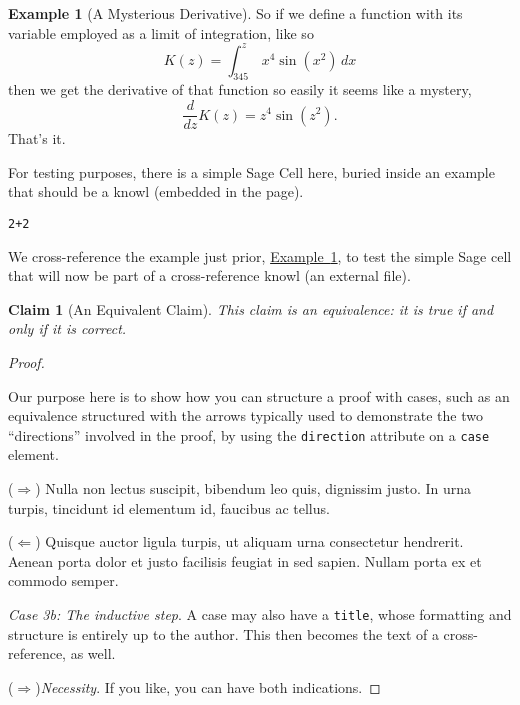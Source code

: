 \documentclass[10pt,]{article}
\newcommand{\forwardimplication}{($\Rightarrow$)\space\space}
\newcommand{\backwardimplication}{($\Leftarrow$)\space\space}
\theoremstyle{plain}
\newtheorem{claim}[theorem]{Claim}
\theoremstyle{definition}
\theoremstyle{definition}
\theoremstyle{definition}
\theoremstyle{definition}
\newtheorem{example}[theorem]{Example}
\theoremstyle{definition}
\theoremstyle{definition}
\numberwithin{equation}{section}
\newcommand{\definiteintegral}[4]{\int_{#1}^{#2}\,#3\,d#4}
\begin{document}
\begin{example}[A Mysterious Derivative]\label{example-mysterious}
\hypertarget{p-38}{}%
So if we define a function with its variable employed as a limit of integration, like so%
\begin{equation*}
K(z)=\definiteintegral{345}{z}{x^4\sin(x^2)}{x}
\end{equation*}
then we get the derivative of that function so easily it seems like a mystery,%
\begin{equation*}
\frac{d}{dz}K(z)=z^4\sin(z^2)\text{.}
\end{equation*}
That's it.%
\par
\hypertarget{p-39}{}%
For testing purposes, there is a simple Sage Cell here, buried inside an example that should be a knowl (embedded in the page).%
\begin{lstlisting}[style=sageinput]
2+2
\end{lstlisting}
\end{example}
\hypertarget{p-40}{}%
We cross-reference the example just prior, \hyperref[example-mysterious]{Example~\ref{example-mysterious}}, to test the simple Sage cell that will now be part of a cross-reference knowl (an external file).%
\begin{claim}[{An Equivalent Claim}]\label{claim-with-cases}
\hypertarget{p-41}{}%
This claim is an equivalence: it is true if and only if it is correct.%
\end{claim}
\begin{proof}\hypertarget{proof-4}{}
\hypertarget{p-42}{}%
Our purpose here is to show how you can structure a proof with cases, such as an equivalence structured with the arrows typically used to demonstrate the two ``directions'' involved in the proof, by using the \lstinline?direction? attribute on a \lstinline?case? element.%
\par\medskip\noindent
\hypertarget{case-1}{}\forwardimplication{}\hypertarget{p-43}{}%
Nulla non lectus suscipit, bibendum leo quis, dignissim justo. In urna turpis, tincidunt id elementum id, faucibus ac tellus.%
\par\medskip\noindent
\hypertarget{case-2}{}\backwardimplication{}\hypertarget{p-44}{}%
Quisque auctor ligula turpis, ut aliquam urna consectetur hendrerit. Aenean porta dolor et justo facilisis feugiat in sed sapien. Nullam porta ex et commodo semper.%
\par\medskip\noindent
\hypertarget{inductive-step}{}\textit{Case 3b: The inductive step}. \hypertarget{p-45}{}%
A case may also have a \lstinline?title?, whose formatting and structure is entirely up to the author.  This then becomes the text of a cross-reference, as well.%
\par\medskip\noindent
\hypertarget{forward}{}\forwardimplication{}\textit{Necessity}. \hypertarget{p-46}{}%
If you like, you can have both indications.%
\end{proof}
\typeout{************************************************}
\typeout{************************************************}
\end{document}
